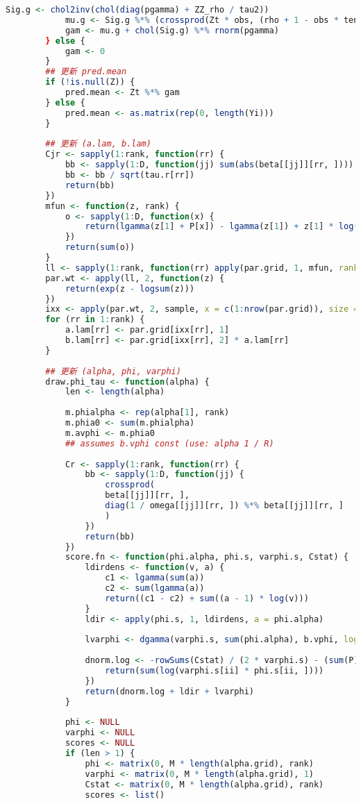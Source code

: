\documentclass[AutoFakeBold]{LZUThesis}
\begin{document}
\begin{lstlisting}[language=R, caption = {BT-SVM}算法]
			Sig.g <- chol2inv(chol(diag(pgamma) + ZZ_rho / tau2))
			mu.g <- Sig.g %*% (crossprod(Zt * obs, (rho + 1 - obs * tens.mean) / (rho * tau2)))
			gam <- mu.g + chol(Sig.g) %*% rnorm(pgamma)
		} else {
			gam <- 0
		}
		## 更新 pred.mean
		if (!is.null(Z)) {
			pred.mean <- Zt %*% gam
		} else {
			pred.mean <- as.matrix(rep(0, length(Yi)))
		}
		
		## 更新 (a.lam, b.lam)
		Cjr <- sapply(1:rank, function(rr) {
			bb <- sapply(1:D, function(jj) sum(abs(beta[[jj]][rr, ])))
			bb <- bb / sqrt(tau.r[rr])
			return(bb)
		})
		mfun <- function(z, rank) {
			o <- sapply(1:D, function(x) {
				return(lgamma(z[1] + P[x]) - lgamma(z[1]) + z[1] * log(z[2] * z[1]) - (z[1] + P[x]) * log(z[2] * z[1] + Cjr[x, rank]))
			})
			return(sum(o))
		}
		ll <- sapply(1:rank, function(rr) apply(par.grid, 1, mfun, rank = rr))
		par.wt <- apply(ll, 2, function(z) {
			return(exp(z - logsum(z)))
		})
		ixx <- apply(par.wt, 2, sample, x = c(1:nrow(par.grid)), size = 1, replace = F)
		for (rr in 1:rank) {
			a.lam[rr] <- par.grid[ixx[rr], 1]
			b.lam[rr] <- par.grid[ixx[rr], 2] * a.lam[rr]
		}
		
		## 更新 (alpha, phi, varphi)
		draw.phi_tau <- function(alpha) {
			len <- length(alpha)
			
			m.phialpha <- rep(alpha[1], rank)
			m.phia0 <- sum(m.phialpha)
			m.avphi <- m.phia0
			## assumes b.vphi const (use: alpha 1 / R)
			
			Cr <- sapply(1:rank, function(rr) {
				bb <- sapply(1:D, function(jj) {
					crossprod(
					beta[[jj]][rr, ],
					diag(1 / omega[[jj]][rr, ]) %*% beta[[jj]][rr, ]
					)
				})
				return(bb)
			})
			score.fn <- function(phi.alpha, phi.s, varphi.s, Cstat) {
				ldirdens <- function(v, a) {
					c1 <- lgamma(sum(a))
					c2 <- sum(lgamma(a))
					return((c1 - c2) + sum((a - 1) * log(v)))
				}
				ldir <- apply(phi.s, 1, ldirdens, a = phi.alpha)
				
				lvarphi <- dgamma(varphi.s, sum(phi.alpha), b.vphi, log = T)
				
				dnorm.log <- -rowSums(Cstat) / (2 * varphi.s) - (sum(P) / 2) * sapply(1:length(varphi.s), function(ii) {
					return(sum(log(varphi.s[ii] * phi.s[ii, ])))
				})
				return(dnorm.log + ldir + lvarphi)
			}
			
			phi <- NULL
			varphi <- NULL
			scores <- NULL
			if (len > 1) {
				phi <- matrix(0, M * length(alpha.grid), rank)
				varphi <- matrix(0, M * length(alpha.grid), 1)
				Cstat <- matrix(0, M * length(alpha.grid), rank)
				scores <- list()
				

\end{lstlisting}
\end{document}
